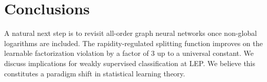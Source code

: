 \section{Conclusions}\label{sec:conclusions}

A natural next step is to revisit all-order graph neural networks once
non-global logarithms are included. The rapidity-regulated splitting
function improves on the learnable factorization violation by a factor
of 3 up to a universal constant. We discuss implications for weakly
supervised classification at LEP. We believe this constitutes a paradigm
shift in statistical learning theory.

